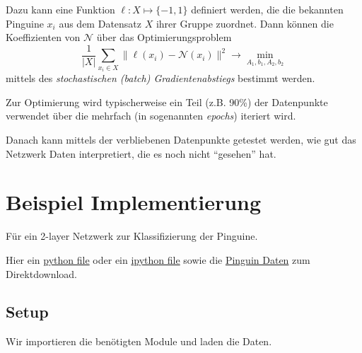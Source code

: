 \documentclass[
]{book}
\theoremstyle{definition}
\theoremstyle{definition}
\theoremstyle{definition}
\theoremstyle{definition}
\theoremstyle{remark}
\begin{document}
Dazu kann eine Funktion \(\ell \colon X \mapsto \{-1, 1\}\) definiert werden, die die bekannten Pinguine \(x_i\) aus dem Datensatz \(X\) ihrer Gruppe zuordnet. Dann können die Koeffizienten von \(\mathcal N\) über das Optimierungsproblem
\begin{equation*}
\frac{1}{|X|}\sum_{x_i \in X} \|\ell(x_i)-\mathcal N(x_i)\|^2 \to \min_{A_1, b_1, A_2, b_2}
\end{equation*}
mittels des \emph{stochastischen (batch) Gradientenabstiegs} bestimmt werden.

Zur Optimierung wird typischerweise ein Teil (z.B. 90\%) der Datenpunkte
verwendet über die mehrfach (in sogenannten \emph{epochs}) iteriert wird.

Danach kann mittels der verbliebenen Datenpunkte getestet werden, wie gut das
Netzwerk Daten interpretiert, die es noch nicht ``gesehen'' hat.

\hypertarget{beispiel-implementierung}{%
\section{Beispiel Implementierung}\label{beispiel-implementierung}}

Für ein 2-layer Netzwerk zur Klassifizierung der Pinguine.

Hier ein \href{files/051_sngltarg.py}{python file} oder ein \href{files/051_sngltarg.ipynb}{ipython
file} sowie die \href{files/penguin-data.json}{Pinguin
Daten} zum Direktdownload.

\hypertarget{setup}{%
\subsection{Setup}\label{setup}}

Wir importieren die benötigten Module und laden die Daten.
\end{document}
